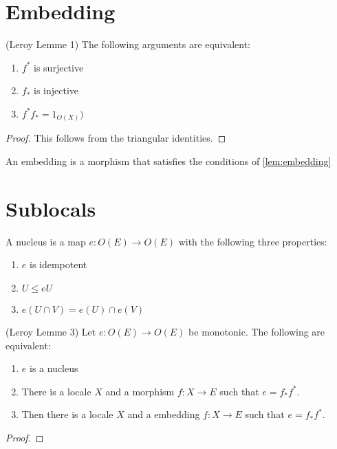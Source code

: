 \section{Embedding}
\begin{lemma}[Embedding]
(Leroy Lemme 1)
    \label{lem:embedding}
    \leanok
    The following arguments are equivalent:
    \begin{enumerate}
        \item $f^*$ is surjective
        \item $f_*$ is injective
        \item $f^{*}f_* = 1_{O(X)})$
    \end{enumerate}
\end{lemma}
\begin{proof}
    This follows from the triangular identities. \leanok
\end{proof}

\begin{definition}[Embedding]
    \label{def:embedding}
    An embedding is a morphism that satisfies the conditions of \cref{lem:embedding}
    \leanok
\end{definition}


\section{Sublocals}
\begin{definition}[Nucleus]
    \label{def:nucleus}
    \mathlibok
    A nucleus is a map $e : O(E) \rightarrow O(E)$ with the following three properties:
    \begin{enumerate}
        \item $e$ is idempotent
        \item $U \le e U$
        \item $e(U \cap V) = e(U) \cap e(V)$
    \end{enumerate}
\end{definition}

\begin{lemma}[Nucleus]
(Leroy Lemme 3)
    \label{lem:nucleus}
    \leanok
    Let $e : O(E) \rightarrow O(E)$ be monotonic. The following are equivalent:
    \begin{enumerate}
        \item $e$ is a nucleus
        \item There is a locale $X$ and a morphism $f: X \rightarrow E$ such that $e = f_*f^*$.
        \item Then there is a locale $X$ and a embedding $f: X \rightarrow E$ such that $e = f_*f^*$.
    \end{enumerate}
\end{lemma}
\begin{proof}
    \leanok
\end{proof}

